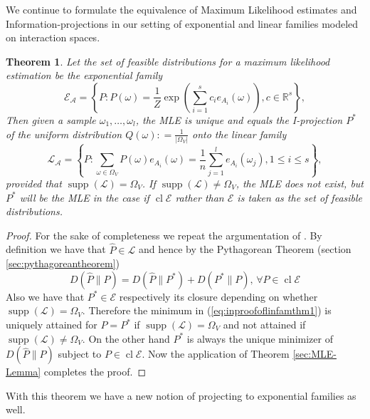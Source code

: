 \documentclass[12pt]{amsart}
\newcommand{\set}[1]{\left\lbrace #1 \right\rbrace} %
\newcommand{\defas}{\mathrel{\mathop{:}}=}   %
\DeclareMathOperator*{\supp}{supp}
\DeclareMathOperator*{\cl}{cl}
\providecommand{\abs}[1]{\left\lvert#1\right\rvert}
\theoremstyle{plain}%
\newtheorem{thm}{Theorem}
\theoremstyle{definition}
\theoremstyle{remark}
\begin{document}
We continue to formulate the equivalence of Maximum Likelihood
estimates and Information-projections in our setting of exponential
and linear families modeled on interaction spaces.
\begin{thm}
\label{sec:MLEequalsprojectiontheorem}
Let the set of feasible distributions for a maximum likelihood
estimation be the exponential family
\begin{equation}
  \label{eq:expfamilyformle}
  \mathcal{E}_\mathcal{A} = \set{ P : P(\omega) = 
    \frac{1}{Z} \exp 
    \left(\sum_{i=1}^{s} c_i e_{A_i}(\omega)\right), 
    c \in \mathbb{R}^s },
\end{equation}
Then given a sample $\omega_1,\ldots,\omega_l$, the MLE is unique and
equals the I-projection $P^*$ of the uniform distribution $Q(\omega)
\defas \frac{1}{\abs{\Omega_V}}$ onto the linear family
\begin{equation}
  \label{eq:linfamilymlethm}
  \mathcal{L}_\mathcal{A} = \set{P: \sum_{\omega\in\Omega_V} P(\omega) e_{A_i}(\omega) = \frac{1}{n} \sum_{j=1}^{l} e_{A_i}(\omega_j), 1\leq i \leq s },
\end{equation}
provided that $\supp(\mathcal{L}) = \Omega_V$. If
$\supp(\mathcal{L})\neq \Omega_V$, the MLE does not exist, but $P^*$
will be the MLE in the case if $\cl\mathcal{E}$ rather than
$\mathcal{E}$ is taken as the set of feasible distributions.
\end{thm}
\begin{proof} For the sake of completeness we repeat the argumentation
  of \cite{csiszarshields04}. By definition we have that $\hat{P} \in
  \mathcal{L}$ and hence by the Pythagorean Theorem (section
  \ref{sec:pythagoreantheorem})
  \begin{equation}
    \label{eq:inproofoflinfamthm1}
    D(\hat{P}\parallel P) = D(\hat{P}\parallel P^{*}) + D(P^{*}\parallel P), \, \forall P\in \cl\mathcal{E}
 \end{equation}
 Also we have that $P^* \in \mathcal{E}$ respectively its closure
 depending on whether $\supp(\mathcal{L})=\Omega_V$. Therefore the
 minimum in (\ref{eq:inproofoflinfamthm1}) is uniquely attained for
 $P=P^*$ if $\supp(\mathcal{L})=\Omega_V$ and not attained if
 $\supp(\mathcal{L})\neq\Omega_V$. On the other hand $P^*$ is always the
 unique minimizer of $D(\hat{P}\parallel P)$ subject to
 $P\in\cl\mathcal{E}$. Now the application of Theorem
 \ref{sec:MLE-Lemma} completes the proof.
\end{proof}

With this theorem we have a new notion of projecting to exponential
families as well.
\end{document}
